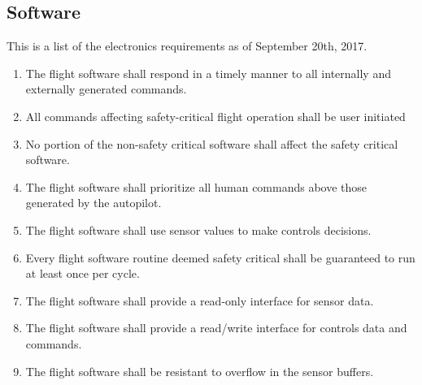 \documentclass{article}
\begin{document}
\subsection{Software}
This is a list of the electronics requirements as of September 20th, 2017.
\begin{enumerate}
  \item{The flight software shall respond in a timely manner to all internally and externally generated commands.}
  \item{All commands affecting safety-critical flight operation shall be user initiated}
  \item{No portion of the non-safety critical software shall affect the safety critical software.}
  \item{The flight software shall prioritize all human commands above those generated by the autopilot.}
  \item{The flight software shall use sensor values to make controls decisions.}
  \item{Every flight software routine deemed safety critical shall be guaranteed to run at least once per cycle.}
  \item{The flight software shall provide a read-only interface for sensor data.}
  \item{The flight software shall provide a read/write interface for controls data and commands. }
  \item{The flight software shall be resistant to overflow in the sensor buffers.}

\end{enumerate}
\end{document}
